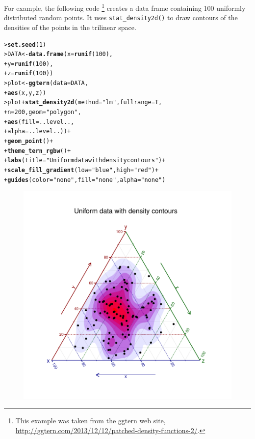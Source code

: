 \documentclass[10pt,krantz2]{krantz}\usepackage[]{graphicx}\usepackage[]{color}
\makeatletter
\newcommand{\hlnum}[1]{\textcolor[rgb]{0.686,0.059,0.569}{#1}}%
\newcommand{\hlstr}[1]{\textcolor[rgb]{0.192,0.494,0.8}{#1}}%
\newcommand{\hlopt}[1]{\textcolor[rgb]{0,0,0}{#1}}%
\newcommand{\hlstd}[1]{\textcolor[rgb]{0.345,0.345,0.345}{#1}}%
\newcommand{\hlkwb}[1]{\textcolor[rgb]{0.69,0.353,0.396}{#1}}%
\newcommand{\hlkwc}[1]{\textcolor[rgb]{0.333,0.667,0.333}{#1}}%
\newcommand{\hlkwd}[1]{\textcolor[rgb]{0.737,0.353,0.396}{\textbf{#1}}}%
\newenvironment{kframe}{%
 \def\at@end@of@kframe{}%
 \ifinner\ifhmode%
  \def\at@end@of@kframe{\end{minipage}}%
  \begin{minipage}{\columnwidth}%
 \fi\fi%
 \def\FrameCommand##1{\hskip\@totalleftmargin \hskip-\fboxsep
 \colorbox{shadecolor}{##1}\hskip-\fboxsep
     \hskip-\linewidth \hskip-\@totalleftmargin \hskip\columnwidth}%
 \MakeFramed {\advance\hsize-\width
   \@totalleftmargin\z@ \linewidth\hsize
   \@setminipage}}%
 {\par\unskip\endMakeFramed%
 \at@end@of@kframe}
\newenvironment{knitrout}{}{} %
\renewenvironment{knitrout}{\small\renewcommand{\baselinestretch}{.85}}{} %
\makeatother
\begin{document}
For example, the following code%
\footnote{
This example was taken from the ggtern web site,
\url{http://ggtern.com/2013/12/12/patched-density-functions-2/}.
}
creates a data frame
 containing 100 uniformly distributed
random points.  It uses \verb|stat_density2d()|
to draw contours of the densities of the points in the
trilinear space.
\begin{knitrout}
\color{fgcolor}\begin{kframe}
\begin{alltt}
\hlstd{> }\hlkwd{set.seed}\hlstd{(}\hlnum{1}\hlstd{)}
\hlstd{> }\hlstd{DATA} \hlkwb{<-} \hlkwd{data.frame}\hlstd{(}\hlkwc{x} \hlstd{=} \hlkwd{runif}\hlstd{(}\hlnum{100}\hlstd{),}
\hlstd{+ }                   \hlkwc{y} \hlstd{=} \hlkwd{runif}\hlstd{(}\hlnum{100}\hlstd{),}
\hlstd{+ }                   \hlkwc{z} \hlstd{=} \hlkwd{runif}\hlstd{(}\hlnum{100}\hlstd{))}
\hlstd{> }\hlstd{plot} \hlkwb{<-} \hlkwd{ggtern}\hlstd{(}\hlkwc{data} \hlstd{= DATA,}
\hlstd{+ }               \hlkwd{aes}\hlstd{(x, y, z))}
\hlstd{> }\hlstd{plot} \hlopt{+} \hlkwd{stat_density2d}\hlstd{(}\hlkwc{method} \hlstd{=} \hlstr{"lm"}\hlstd{,} \hlkwc{fullrange} \hlstd{= T,}
\hlstd{+ }                      \hlkwc{n} \hlstd{=} \hlnum{200}\hlstd{,} \hlkwc{geom} \hlstd{=} \hlstr{"polygon"}\hlstd{,}
\hlstd{+ }                      \hlkwd{aes}\hlstd{(}\hlkwc{fill} \hlstd{= ..level..,}
\hlstd{+ }                          \hlkwc{alpha} \hlstd{= ..level..))} \hlopt{+}
\hlstd{+ }    \hlkwd{geom_point}\hlstd{()} \hlopt{+}
\hlstd{+ }    \hlkwd{theme_tern_rgbw}\hlstd{()} \hlopt{+}
\hlstd{+ }    \hlkwd{labs}\hlstd{(}\hlkwc{title} \hlstd{=} \hlstr{"Uniform data with density contours"}\hlstd{)}    \hlopt{+}
\hlstd{+ }    \hlkwd{scale_fill_gradient}\hlstd{(}\hlkwc{low} \hlstd{=} \hlstr{"blue"}\hlstd{,}\hlkwc{high} \hlstd{=} \hlstr{"red"}\hlstd{)}  \hlopt{+}
\hlstd{+ }    \hlkwd{guides}\hlstd{(}\hlkwc{color} \hlstd{=} \hlstr{"none"}\hlstd{,} \hlkwc{fill} \hlstd{=} \hlstr{"none"}\hlstd{,} \hlkwc{alpha} \hlstd{=} \hlstr{"none"}\hlstd{)}
\end{alltt}
\end{kframe}\begin{figure}[!htbp]

\centerline{\includegraphics[width=.6\textwidth,trim=20 20 20 20,clip]{ch04/fig/ggterm-demo-1} }


\end{figure}
\end{knitrout}
\end{document}
